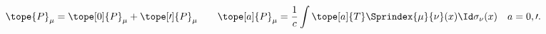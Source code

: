 \begin{equation}	\label{12.4}
\tope{P}_{\mu}
=
\tope[0]{P}_{\mu} + \tope[\prime]{P}_{\mu}
\qquad
\tope[a]{P}_{\mu}
=
\frac{1}{c} \int \tope[a]{T}\Sprindex{\mu}{\nu}(x) \Id\sigma_\nu(x)
\quad
a=0,\prime .
	\end{equation}

